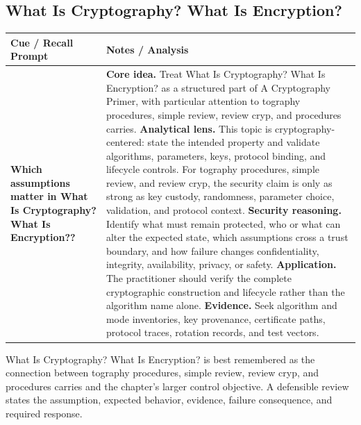 \documentclass[11pt]{article}
\newcommand{\CornellHeader}{%
\rowcolor{Navy}\color{white}\bfseries Cue / Recall Prompt & \color{white}\bfseries Notes / Analysis\\\hline}
\newcommand{\CornellRow}[2]{%
\cellcolor{CueGray}\RaggedRight\textbf{#1} & \RaggedRight #2\\\hline}
\begin{document}
\subsection*{What Is Cryptography? What Is Encryption?}
\begin{longtable}{>{\RaggedRight\arraybackslash}p{}|>{\RaggedRight\arraybackslash}p{}}
\CornellHeader
\CornellRow{Which assumptions matter in What Is Cryptography? What Is Encryption??}{\textbf{Core idea.} Treat What Is Cryptography? What Is Encryption? as a structured part of A Cryptography Primer, with particular attention to tography procedures, simple review, review cryp, and procedures carries. \textbf{Analytical lens.} This topic is cryptography-centered: state the intended property and validate algorithms, parameters, keys, protocol binding, and lifecycle controls. For tography procedures, simple review, and review cryp, the security claim is only as strong as key custody, randomness, parameter choice, validation, and protocol context. \textbf{Security reasoning.} Identify what must remain protected, who or what can alter the expected state, which assumptions cross a trust boundary, and how failure changes confidentiality, integrity, availability, privacy, or safety. \textbf{Application.} The practitioner should verify the complete cryptographic construction and lifecycle rather than the algorithm name alone. \textbf{Evidence.} Seek algorithm and mode inventories, key provenance, certificate paths, protocol traces, rotation records, and test vectors.}
\end{longtable}
\begin{topicsummary}
What Is Cryptography? What Is Encryption? is best remembered as the connection between tography procedures, simple review, review cryp, and procedures carries and the chapter's larger control objective. A defensible review states the assumption, expected behavior, evidence, failure consequence, and required response.
\end{topicsummary}
\end{document}
